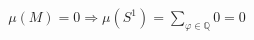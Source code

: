 \documentclass[preview]{standalone}
\begin{document}
\begin{align*}
\mu(M) = 0 \Rightarrow  \mu(S^1) = \sum_{\varphi \in \mathbb{Q}} 0 = 0
\end{align*}
\end{document}
